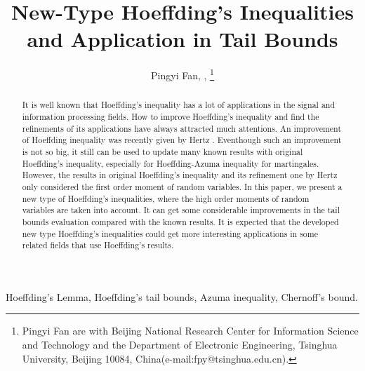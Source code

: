 \documentclass[journal]{IEEEtran}
\begin{document}
\title{New-Type Hoeffding's Inequalities and Application in Tail Bounds }

\author{Pingyi Fan, ,
\thanks{Pingyi Fan are with Beijing National Research Center for Information Science and Technology and the Department of Electronic Engineering, Tsinghua University, Beijing 10084, China(e-mail:fpy@tsinghua.edu.cn).}
}

\maketitle

\begin{abstract}
It is well known that Hoeffding's inequality has a lot of applications in the signal and information processing fields. How to improve Hoeffding's inequality and find the refinements of its applications have always attracted much attentions. An improvement of Hoeffding inequality was recently given by Hertz \cite{r1}. Eventhough such an improvement is not so big, it still can be used to update  many known results with original Hoeffding's inequality, especially for Hoeffding-Azuma inequality for martingales. However, the results in original Hoeffding's inequality and its refinement one by Hertz only considered the first order moment of random variables. In this paper, we present a new type of Hoeffding's inequalities, where the high order moments of random variables are taken into account.  It can get some considerable improvements in the tail bounds evaluation compared with the known results. It is expected that the developed new type Hoeffding's inequalities could get more interesting applications in some related fields that use Hoeffding's results.
\end{abstract}

\begin{IEEEkeywords}
Hoeffding's Lemma, Hoeffding's tail bounds, Azuma inequality, Chernoff's bound.
\end{IEEEkeywords}


\IEEEpeerreviewmaketitle
\end{document}
